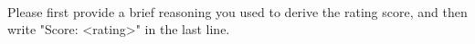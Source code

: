 \begin{table}[t]
{\begin{minipage}{40em}
\begin{small}
\begin{lmttfont}
\\
Please first provide a brief reasoning you used to derive the rating score, and then write "Score: <rating>" in the last line.\\
\end{lmttfont}
\end{small}
 \\
 \\
\end{minipage}
}
\vspace{1mm}

\end{table}

